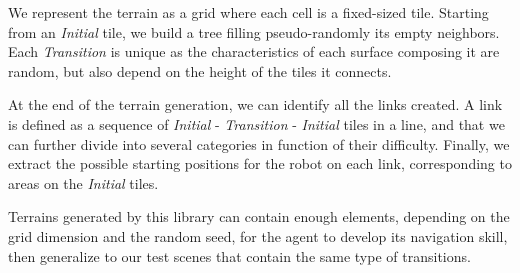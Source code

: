We represent the terrain as a grid where each cell is a fixed-sized tile. Starting from an \textit{Initial} tile, we build a tree filling pseudo-randomly its empty neighbors. Each \textit{Transition} is unique as the characteristics of each surface composing it are random, but also depend on the height of the tiles it connects.

At the end of the terrain generation, we can identify all the links created. 
A link is defined as a sequence of \textit{Initial} - \textit{Transition} - \textit{Initial} tiles in a line, and that we can further divide into several categories in function of their difficulty. 
Finally, we extract the possible starting positions for the robot on each link, corresponding to areas on the \textit{Initial} tiles. 

Terrains generated by this library can contain enough elements, depending on the grid dimension and the random seed, for the agent to develop its navigation skill, then generalize to our test scenes that contain the same type of transitions.



